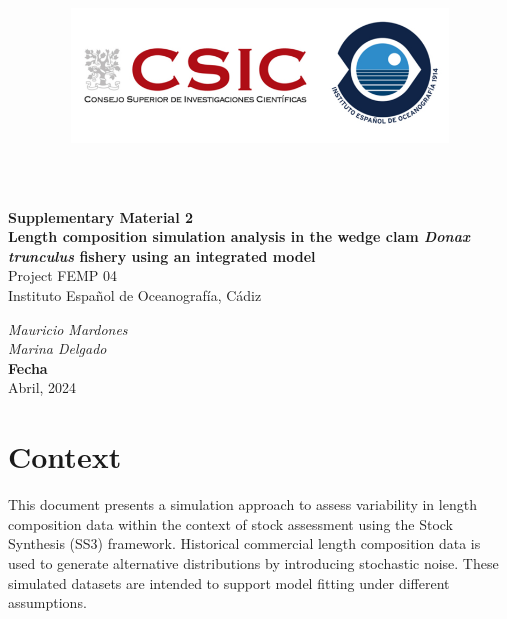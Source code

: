 \documentclass[
]{article}
\title{\includegraphics[width=10cm,height=\textheight,keepaspectratio]{IEO-logo2.png}}
\author{}
\date{\vspace{-2.5em}}
\begin{document}
\maketitle



\begin{flushleft}
\Large{\textbf{Supplementary Material 2}}\\
\vspace*{2\baselineskip}
\LARGE{\textbf{Length composition simulation analysis in the wedge clam \textit{Donax trunculus} fishery using an integrated model}}\\
\vspace*{5\baselineskip}
\Large{Project FEMP 04}\\
\vspace*{1\baselineskip}
\Large{Instituto Español de Oceanografía, Cádiz }\\
\vspace*{4\baselineskip}
\end{flushleft}
\begin{flushright}
\large{\textit{Mauricio Mardones}}\\
\large{\textit{Marina Delgado}}\\
\vspace*{1\baselineskip}
\normalsize{\textbf{Fecha}}\\
Abril, 2024
\end{flushright}



\hypersetup{linkcolor = black}
\newpage
{}

\newpage



\hypersetup{linkcolor = blue}

{
\hypersetup{linkcolor=}
\setcounter{tocdepth}{3}
\tableofcontents
}
\pagebreak

\section{Context}\label{context}

This document presents a simulation approach to assess variability in length composition data within the context of stock assessment using the Stock Synthesis (SS3) framework. Historical commercial length composition data is used to generate alternative distributions by introducing stochastic noise. These simulated datasets are intended to support model fitting under different assumptions.
\end{document}
